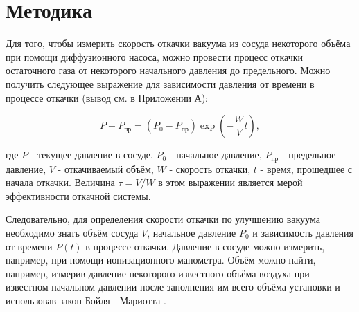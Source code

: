 \chapter{Методика}
\label{ch:methods}


Для того, чтобы измерить скорость откачки вакуума из сосуда некоторого объёма при помощи диффузионного насоса, можно провести процесс откачки остаточного газа от некоторого начального давления до предельного. Можно получить следующее выражение для зависимости давления от времени в процессе откачки (вывод см. в Приложении А):

\begin{equation}
    P-P_\text{пр}=(P_0 - P_\text{пр})\exp\left(-\frac{W}{V}t\right),
\end{equation}

где $P$ - текущее давление в сосуде, $P_0$ - начальное давление, $P_\text{пр}$ - предельное давление, $V$ - откачиваемый объём, $W$ - скорость откачки, $t$ - время, прошедшее с начала откачки. Величина $\tau=V/W$ в этом выражении является мерой эффективности откачной системы.

Следовательно, для определения скорости откачки по улучшению вакуума необходимо знать объём сосуда $V$, начальное давление $P_0$ и зависимость давления от времени $P(t)$ в процессе откачки. Давление в сосуде можно измерить, например, при помощи ионизационного манометра. Объём можно найти, например, измерив давление некоторого известного объёма воздуха при известном начальном давлении после заполнения им всего объёма установки и использовав закон Бойля - Мариотта .


